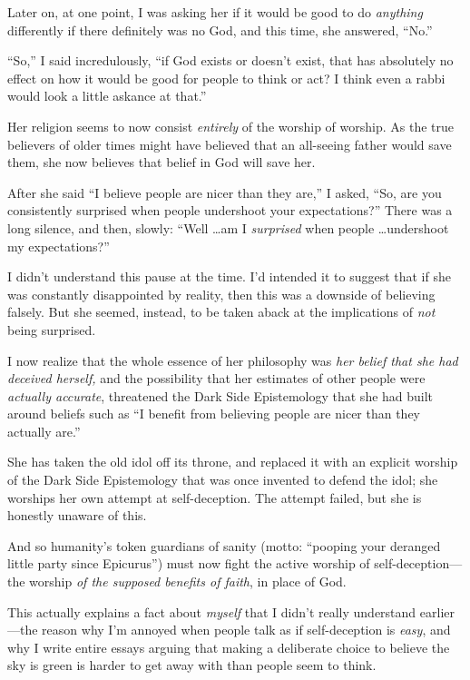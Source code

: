 {
 Later on, at one point, I was asking her if it would be good to do
\textit{anything} differently if there definitely was no God, and this
time, she answered, ``No.''}

{
 ``So,'' I said incredulously,
``if God exists or doesn't exist, that
has absolutely no effect on how it would be good for people to think or
act? I think even a rabbi would look a little askance at
that.''}

{
 Her religion seems to now consist \textit{entirely} of the worship
of worship. As the true believers of older times might have believed
that an all-seeing father would save them, she now believes that belief
in God will save her.}

{
 After she said ``I believe people are nicer than
they are,'' I asked, ``So, are you
consistently surprised when people undershoot your
expectations?'' There was a long silence, and then,
slowly: ``Well \ldots am I \textit{surprised} when
people \ldots undershoot my expectations?''}

{
 I didn't understand this pause at the time.
I'd intended it to suggest that if she was constantly
disappointed by reality, then this was a downside of believing falsely.
But she seemed, instead, to be taken aback at the implications of
\textit{not} being surprised.}

{
 I now realize that the whole essence of her philosophy was
\textit{her belief that she had deceived herself,} and the possibility
that her estimates of other people were \textit{actually accurate},
threatened the Dark Side Epistemology that she had built around beliefs
such as ``I benefit from believing people are nicer
than they actually are.''}

{
 She has taken the old idol off its throne, and replaced it with an
explicit worship of the Dark Side Epistemology that was once invented
to defend the idol; she worships her own attempt at self-deception. The
attempt failed, but she is honestly unaware of this.}

{
 And so humanity's token guardians of sanity
(motto: ``pooping your deranged little party since
Epicurus'') must now fight the active worship of
self-deception---the worship \textit{of the supposed benefits of
faith}, in place of God.}

{
 This actually explains a fact about \textit{myself} that I
didn't really understand earlier---the reason why
I'm annoyed when people talk as if self-deception is
\textit{easy}, and why I write entire essays arguing that making a
deliberate choice to believe the sky is green is harder to get away
with than people seem to think.}

